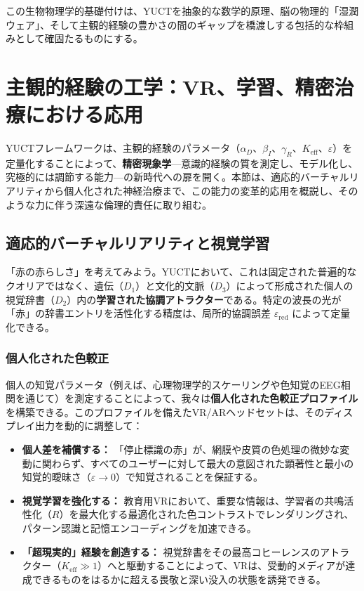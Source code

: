 \documentclass[12pt,a4paper]{article}
\begin{document}
	この生物物理学的基礎付けは、YUCTを抽象的な数学的原理、脳の物理的「湿潤ウェア」、そして主観的経験の豊かさの間のギャップを橋渡しする包括的な枠組みとして確固たるものにする。
	
	\section{主観的経験の工学：VR、学習、精密治療における応用}
	
	YUCTフレームワークは、主観的経験のパラメータ（\(\alpha_D\)、\(\beta_I\)、\(\gamma_R\)、\(K_{\mathrm{eff}}\)、\(\varepsilon\)）を定量化することによって、\textbf{精密現象学}—意識的経験の質を測定し、モデル化し、究極的には調節する能力—の新時代への扉を開く。本節は、適応的バーチャルリアリティから個人化された神経治療まで、この能力の変革的応用を概説し、そのような力に伴う深遠な倫理的責任に取り組む。
	
	\subsection{適応的バーチャルリアリティと視覚学習}
	
	「赤の赤らしさ」を考えてみよう。YUCTにおいて、これは固定された普遍的なクオリアではなく、遺伝（\(D_1\)）と文化的文脈（\(D_3\)）によって形成された個人の視覚辞書（\(D_2\)）内の\textbf{学習された協調アトラクター}である。特定の波長の光が「赤」の辞書エントリを活性化する精度は、局所的協調誤差 \(\varepsilon_{\text{red}}\) によって定量化できる。
	
	\subsubsection{個人化された色較正}
	個人の知覚パラメータ（例えば、心理物理学的スケーリングや色知覚のEEG相関を通じて）を測定することによって、我々は\textbf{個人化された色較正プロファイル}を構築できる。このプロファイルを備えたVR/ARヘッドセットは、そのディスプレイ出力を動的に調整して：
	\begin{itemize}
		\item \textbf{個人差を補償する：} 「停止標識の赤」が、網膜や皮質の色処理の微妙な変動に関わらず、すべてのユーザーに対して最大の意図された顕著性と最小の知覚的曖昧さ（\(\varepsilon \to 0\)）で知覚されることを保証する。
		\item \textbf{視覚学習を強化する：} 教育用VRにおいて、重要な情報は、学習者の共鳴活性化（\(R\)）を最大化する最適化された色コントラストでレンダリングされ、パターン認識と記憶エンコーディングを加速できる。
		\item \textbf{「超現実的」経験を創造する：} 視覚辞書をその最高コヒーレンスのアトラクター（\(K_{\mathrm{eff}} \gg 1\)）へと駆動することによって、VRは、受動的メディアが達成できるものをはるかに超える畏敬と深い没入の状態を誘発できる。
	\end{itemize}
	
\end{document}
